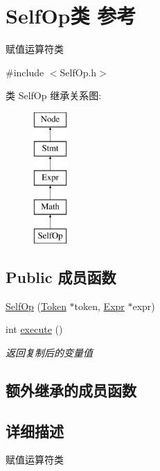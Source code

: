 \hypertarget{class_self_op}{}\section{Self\+Op类 参考}
\label{class_self_op}


赋值运算符类  




{\ttfamily \#include $<$Self\+Op.\+h$>$}

类 Self\+Op 继承关系图\+:\begin{figure}[H]
\begin{center}
\leavevmode
\includegraphics[height=5.000000cm]{class_self_op}
\end{center}
\end{figure}
\subsection*{Public 成员函数}
\begin{DoxyCompactItemize}
\item 
\hyperlink{class_self_op_a5292e81fca1817185db15b29564a32ee}{Self\+Op} (\hyperlink{class_token}{Token} $\ast$token, \hyperlink{class_expr}{Expr} $\ast$expr)
\item 
int \hyperlink{class_self_op_ab452bcad1cd4f1286813b1f737583818}{execute} ()\hypertarget{class_self_op_ab452bcad1cd4f1286813b1f737583818}{}\label{class_self_op_ab452bcad1cd4f1286813b1f737583818}

\begin{DoxyCompactList}\small\item\em 返回复制后的变量值 \end{DoxyCompactList}\end{DoxyCompactItemize}
\subsection*{额外继承的成员函数}


\subsection{详细描述}
赋值运算符类 

